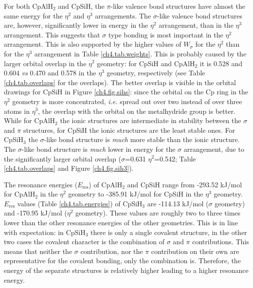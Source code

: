For both CpAlH$_2$ and CpSiH, the $\pi$-like valence bond structures have almost the same energy for the $\eta^{2}$ and $\eta^{3}$ arrangements. The $\sigma$-like valence bond structures are, however, significantly lower in energy in the $\eta^{2}$ arrangement, than in the $\eta^{3}$ arrangement. This suggests that $\sigma$ type bonding is most important in the $\eta^2$ arrangement. This is also supported by the higher values of $W_\sigma$ for the $\eta^2$ than for the $\eta^3$ arrangement in Table \ref{ch4.tab.weights}. This is probably caused by the larger orbital overlap in the $\eta^2$ geometry: for CpSiH and CpAlH$_2$ it is 0.528 and 0.604 \textit{vs} 0.470 and 0.578 in the $\eta^3$ geometry, respectively (see Table \ref{ch4.tab.overlaps} for the overlaps). The better overlap is visible in the orbital drawings for CpSiH in Figure \ref{ch4.fig.sihs}: since the orbital on the Cp ring in the $\eta^2$ geometry is more concentrated, \textit{i.e.} spread out over two instead of over three atoms in $\eta^3$, the overlap with the orbital on the metalhydride group is better. While for CpAlH$_2$ the ionic structures are intermediate in stability between the $\sigma$ and $\pi$ structures, for CpSiH the ionic structures are the least stable ones. For CpSiH$_3$ the $\sigma$-like bond structure is \textit{much} more stable than the ionic structure. The $\sigma$-like bond structure is \textit{much} lower in energy for the $\sigma$ arrangement, due to the significantly larger orbital overlap ($\sigma$=0.631 $\eta^2$=0.542; Table \ref{ch4.tab.overlaps} and Figure \ref{ch4.fig.sih3}). 

The resonance energies ($E_\mathrm{res}$) of CpAlH$_2$ and CpSiH range from \mbox{-293.52} kJ/mol for CpAlH$_2$ in the $\eta^2$ geometry to \mbox{-385.91} kJ/mol for CpSiH in the $\eta^3$ geometry. $E_\mathrm{res}$ values (Table \ref{ch4.tab.energies}) of CpSiH$_3$ are \mbox{-114.13} kJ/mol ($\sigma$ geometry) and \mbox{-170.95} kJ/mol ($\eta^2$ geometry). These values are roughly two to three times lower than the other resonance energies of the other geometries. This is in line with expectation: in CpSiH$_3$ there is only a single covalent structure, in the other two cases the covalent character is the combination of $\sigma$ and $\pi$ contributions. This means that neither the $\sigma$ contribution, nor the $\pi$ contribution on their own are representative for the covalent bonding, only the combination is. Therefore, the energy of the separate structures is relatively higher leading to a higher resonance energy.

